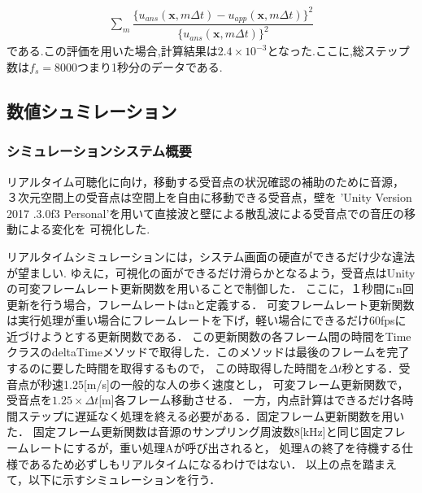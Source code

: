 \documentclass[dvipdfmx]{ampbt}
\begin{document}
\begin{align}
\sum_m \dfrac{\{u_{ans}(\bm{x},m\Delta t)-u_{app}(\bm{x},m\Delta t)\}^2}{ \{u_{ans}(\bm{x},m\Delta t)\}^2 }
\end{align}
である.この評価を用いた場合,計算結果は$2.4 \times 10^{-3}$となった.ここに,総ステップ数は$f_s=8000$つまり1秒分のデータである.

\subsection{数値シュミレーション}
\subsubsection{シミュレーションシステム概要}
リアルタイム可聴化に向け，移動する受音点の状況確認の補助のために音源，
３次元空間上の受音点は空間上を自由に移動できる受音点，壁を
'Unity Version 2017 .3.0f3 Personal'を用いて直接波と壁による散乱波による受音点での音圧の移動による変化を
可視化した.\par
リアルタイムシミュレーションには，システム画面の硬直ができるだけ少な違法が望ましい.
ゆえに，可視化の面ができるだけ滑らかとなるよう，受音点はUnityの可変フレームレート更新関数を用いることで制御した．
ここに，１秒間にn回更新を行う場合，フレームレートはnと定義する．
可変フレームレート更新関数は実行処理が重い場合にフレームレートを下げ，軽い場合にできるだけ60fpsに近づけようとする更新関数である．
この更新関数の各フレーム間の時間をTimeクラスのdeltaTimeメソッドで取得した．このメソッドは最後のフレームを完了するのに要した時間を取得するもので，
この時取得した時間を$\Delta t$秒とする．受音点が秒速1.25[m/s]の一般的な人の歩く速度とし，
可変フレーム更新関数で，受音点を$1.25 \times \Delta t$[m]各フレーム移動させる．
一方，内点計算はできるだけ各時間ステップに遅延なく処理を終える必要がある．固定フレーム更新関数を用いた．
固定フレーム更新関数は音源のサンプリング周波数8[kHz]と同じ固定フレームレートにするが，重い処理Aが呼び出されると，
処理Aの終了を待機する仕様であるため必ずしもリアルタイムになるわけではない．
以上の点を踏まえて，以下に示すシミュレーションを行う．
\end{document}
